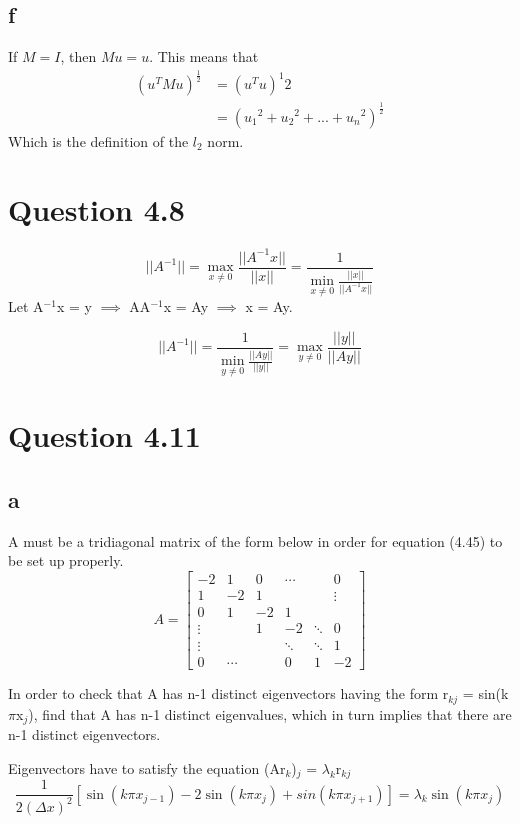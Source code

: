 \documentclass[11pt]{amsart}
\begin{document}
\subsection*{f}
If $M=I$, then $Mu = u$. This means that
\begin{align*}
(u^TMu)^\frac{1}{2} &= (u^Tu)^{1}{2}\\
&= ({u_1}^2 + {u_2}^2 + ... + {u_n}^2)^\frac{1}{2}
\end{align*}
Which is the definition of the $l_2$ norm.
\newline
\newline

\section*{Question 4.8}
\[
||A^{-1}|| = \max_{x \ne 0}{\frac{||A^{-1}x||}{||x||}} = \frac{1}{\min_{x \ne 0}{\frac{||x||}{||A^{-1}x||}}}
\]
Let A$^{-1}$x = y $\implies$ AA$^{-1}$x = Ay $\implies$ x = Ay. 

\[
||A^{-1}|| = \frac{1}{\min_{y \ne 0}{\frac{||Ay||}{||y||}}} =  \max_{y \ne 0}{\frac{||y||}{||Ay||}}
\]
\newline

\section*{Question 4.11}
\subsection*{a}

A must be a tridiagonal matrix of the form below in order for equation (4.45) to be set up properly.
\[
A = \begin{bmatrix}
-2 & 1 & 0 & \cdots & & 0 \\
1 & -2 & 1 &  &  & \vdots \\
0 & 1 & -2 & 1 &    \\
\vdots &  & 1 & -2 & \ddots  & 0\\
\vdots &  & & \ddots & \ddots & 1  \\
0 & \cdots & & 0 & 1 & -2
\end{bmatrix}
\]
\newline

In order to check that A has n-1 distinct eigenvectors having the form r$_{kj}$ = sin(k$\pi$x$_{j}$), find that A has n-1 distinct eigenvalues, which in turn implies that there are n-1 distinct eigenvectors. 

Eigenvectors have to satisfy the equation (Ar$_{k}$)$_{j}$ = $\lambda_{k}$r$_{kj}$
\[
\frac{1}{2(\Delta x)^2}[\sin(k\pi x_{j-1}) - 2\sin(k\pi x_{j}) + sin(k\pi x_{j+1})] = \lambda_{k}\sin(k\pi x_{j})
\]
\end{document}
